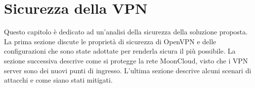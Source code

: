 \chapter{Sicurezza della VPN}\label{chap:security}
Questo capitolo è dedicato ad un'analisi della sicurezza della soluzione proposta.
La prima sezione discute le proprietà di sicurezza di OpenVPN e delle configurazioni
che sono state adottate per renderla sicura il più possibile.
La sezione successiva descrive come si protegge la rete MoonCloud, visto che
i VPN server sono dei nuovi punti di ingresso.
L'ultima sezione descrive alcuni scenari di attacchi e come siano stati
mitigati.






